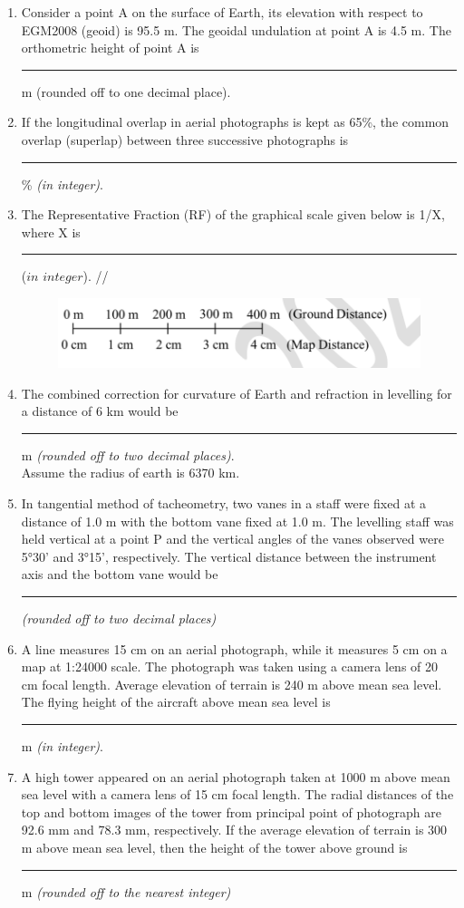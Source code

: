 \documentclass[12pt]{article}
\begin{document}
\begin{enumerate}
\item  Consider a point A on the surface of Earth, its elevation with respect to EGM2008
(geoid) is 95.5 m. The geoidal undulation at point A is 4.5 m. The orthometric height
of point A is \rule{2cm}{0.15mm} m (rounded off to one decimal place).

\item If the longitudinal overlap in aerial photographs is kept as 65\%, the common overlap
(superlap) between three successive photographs is \rule{2cm}{0.15mm}\% \textit{(in integer)}. 

\item The Representative Fraction (RF) of the graphical scale given below is 1/X, where X is \rule{2cm}{0.15mm}($in$ $integer$). //

\begin{figure}[H]
\centering
\includegraphics[width=0.5\linewidth]{Figs/LatexImage7.png}
\end{figure}

\item The combined correction for curvature of Earth and refraction in levelling for a
distance of 6 km would be \rule{2cm}{0.15mm}m \textit{(rounded off to two decimal places)}.\\ 
   Assume the radius of earth is 6370 km.

\item In tangential method of tacheometry, two vanes in a staff were fixed at a distance
of 1.0 m with the bottom vane fixed at 1.0 m. The levelling staff was held vertical
at a point P and the vertical angles of the vanes observed were 5°30' and 3°15',
respectively. The vertical distance between the instrument axis and the bottom vane
would be \rule{2cm}{0.15mm} \textit{(rounded off to two decimal places)} 

\item A line measures 15 cm on an aerial photograph, while it measures 5 cm on a map
at 1:24000 scale. The photograph was taken using a camera lens of 20 cm focal
length. Average elevation of terrain is 240 m above mean sea level. The flying
height of the aircraft above mean sea level is\rule{2cm}{0.15mm} m \textit{(in integer)}.

\item A high tower appeared on an aerial photograph taken at 1000 m above mean sea
level with a camera lens of 15 cm focal length. The radial distances of the top and
bottom images of the tower from principal point of photograph are 92.6 mm and
78.3 mm, respectively. If the average elevation of terrain is 300 m above mean sea
level, then the height of the tower above ground is \rule{2cm}{0.15mm} m \textit{(rounded off to the nearest integer)}


\end{enumerate}
\end{document}
